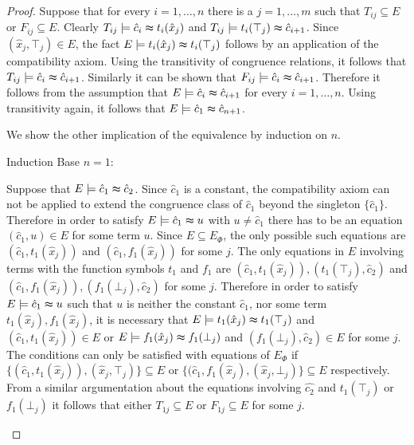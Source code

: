 \begin{proof}

Suppose that for every $i = 1,\ldots,n$ there is a $j = 1,\ldots,m$ such that $T_{ij} \subseteq E$ or $F_{ij} \subseteq E$.
Clearly $T_{ij} \models \hat{c}_i \thickapprox t_i(\hat{x}_j)$ and $T_{ij} \models t_i(\top_j) \thickapprox \hat{c}_{i+1}$. 
Since $(\hat{x}_j,\top_j) \in E$, the fact $E \models t_i(\hat{x}_j) \thickapprox t_i(\top_j)$ follows by an application of the compatibility axiom.
Using the transitivity of congruence relations, it follows that $T_{ij} \models \hat{c}_i \thickapprox \hat{c}_{i+1}$.
Similarly it can be shown that $F_{ij} \models \hat{c}_i \thickapprox \hat{c}_{i+1}$.
Therefore it follows from the assumption that $E \models \hat{c}_i \thickapprox \hat{c}_{i+1}$ for every $i = 1,\ldots,n$.
Using transitivity again, it follows that $E \models \hat{c}_1 \thickapprox \hat{c}_{n+1}$.

\noindent We show the other implication of the equivalence by induction on $n$.
\begin{paragraph}{Induction Base $n = 1$:}

Suppose that $E \models \hat{c}_1 \thickapprox \hat{c}_{2}$. %
Since $\hat{c}_1$ is a constant, the compatibility axiom can not be applied to extend the congruence class of $\hat{c}_1$ beyond the singleton $\{\hat{c}_1\}$.
Therefore in order to satisfy $E \models \hat{c}_1 \thickapprox u$ with $u \neq \hat{c}_1$ there has to be an equation $(\hat{c}_1, u) \in E$ for some term $u$.
Since $E \subseteq E_{\Phi}$, the only possible such equations are $(\hat{c}_1, t_1(\hat{x}_j))$ and $(\hat{c}_1, f_1(\hat{x}_j))$ for some $j$.
The only equations in $E$ involving terms with the function symbols $t_1$ and $f_1$ are $(\hat{c}_1, t_1(\hat{x}_j)), (t_1(\top_j),\hat{c}_2)$ and $(\hat{c}_1, f_1(\hat{x}_j)), (f_1(\bot_j),\hat{c}_2)$ for some $j$.
Therefore in order to satisfy $E \models \hat{c}_1 \thickapprox u$ such that $u$ is neither the constant $\hat{c}_1$, nor some term $t_1(\hat{x}_j), f_1(\hat{x}_j)$, it is necessary that $E \models t_1(\hat{x}_j) \thickapprox t_1(\top_j)$ and $(\hat{c}_1, t_1(\hat{x}_j)) \in E$ or $E \models f_1(\hat{x}_j) \thickapprox f_1(\bot_j)$ and $(f_1(\bot_j),\hat{c}_2) \in E$ for some $j$.
The conditions can only be satisfied with equations of $E_{\Phi}$ if $\{(\hat{c}_1, t_1(\hat{x}_j)), (\hat{x}_j,\top_j)\} \subseteq E$ or $\{(\hat{c}_1, f_1(\hat{x}_j), (\hat{x}_j,\bot_j)\} \subseteq E$ respectively.
From a similar argumentation about the equations involving $\hat{c_2}$ and $t_1(\top_j)$ or $f_1(\bot_j)$ it follows that either $T_{1j} \subseteq E$ or $F_{1j} \subseteq E$ for some $j$.
\end{paragraph}


\end{proof}
